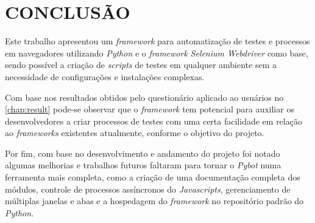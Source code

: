 %
%

\chapter{CONCLUSÃO}\label{chap:conclusao}


    Este trabalho apresentou um \emph{framework} para automatização de testes e processos em navegadores utilizando \emph{Python} e o \emph{framework} \emph{Selenium Webdriver}
    como base, sendo possível a criação de \emph{scripts} de testes em qualquer ambiente sem a necessidade de configurações e instalações complexas.

    Com base nos resultados obtidos pelo questionário aplicado ao usuários no \autoref{chap:result} pode-se observar que o \emph{framework} tem potencial
    para auxiliar os desenvolvedores a criar processos de testes com uma certa facilidade em relação ao \emph{frameworks} existentes atualmente,
    conforme o objetivo do projeto.

    Por fim, com base no desenvolvimento e andamento do projeto foi notado algumas melhorias e trabalhos futuros faltaram para tornar o \emph{Pybot} numa ferramenta
    mais completa, como a criação de uma documentação completa dos módulos, controle de processos assíncronos do \emph{Javascripts}, gerenciamento de múltiplas
    janelas e abas e a hospedagem do \emph{framework} no repositório padrão do \emph{Python}.
